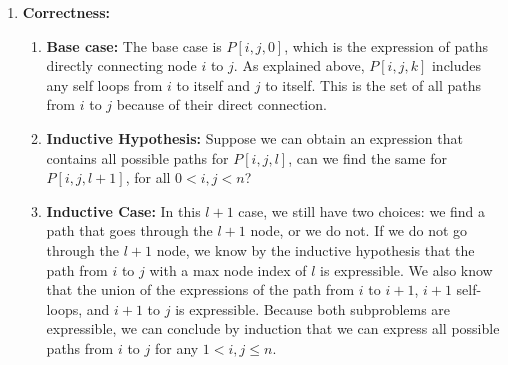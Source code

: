 \documentclass{article}
\begin{document}
\begin{enumerate}
\begin{enumerate}
            \item \textbf{Correctness:}
                \begin{enumerate}
                    \item \textbf{Base case:} The base case is $P\left[i, j, 0\right]$, which is the expression
                        of paths directly connecting node $i$ to $j$. As explained above, $P\left[i, j, k\right]$ 
                        includes any self loops from $i$ to itself and $j$ to itself. This is the set of all paths
                        from $i$ to $j$ because of their direct connection.
                        
                    \item \textbf{Inductive Hypothesis:} Suppose we can obtain an expression that contains all
                        possible paths for $P\left[i, j, l\right]$, can we find the same for $P\left[i, j, 
                        l + 1\right]$, for all $0 < i, j < n$?
                        
                    \item \textbf{Inductive Case:} In this $l + 1$ case, we still have two choices: we find
                        a path that goes through the $l + 1$ node, or we do not. If we do not go through the
                        $l + 1$ node, we know by the inductive hypothesis that the path from $i$ to $j$
                        with a max node index of $l$ is expressible. We also know that the union of the
                        expressions of the path from $i$ to $i + 1$, $i + 1$ self-loops, and $i + 1$ to $j$ 
                        is expressible. Because both subproblems are expressible, we can conclude by
                        induction that we can express all possible paths from $i$ to $j$ for any $1 < i, j \leq n$.
                    
                \end{enumerate}
        \end{enumerate}
\end{enumerate}
\end{document}
